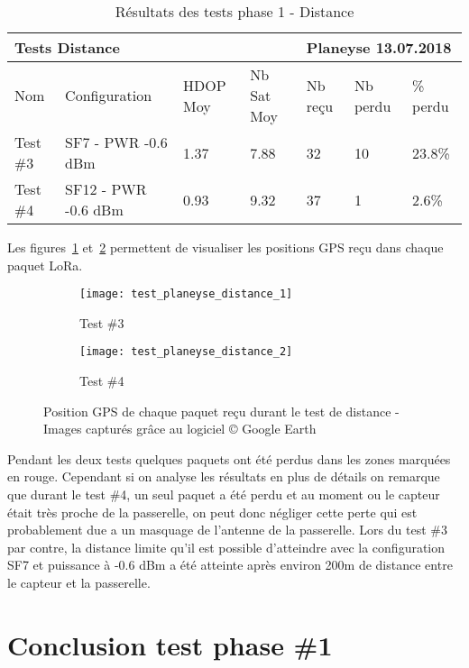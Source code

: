 \begin{table}[htb]
\caption[Résultats des tests phase 1 - Distance]{Résultats des tests phase 1 - Distance}
\label{tab:resultat_test_1_distance}
\centering
\begin{tabular}{lllllll}
\toprule
\multicolumn{4}{l}{ Tests Distance } & \multicolumn{3}{l}{ Planeyse 13.07.2018 } \\
\toprule
Nom & Configuration & HDOP Moy & Nb Sat Moy & Nb reçu & Nb perdu & \% perdu \\
\midrule
Test \#3 & SF7 - PWR -0.6 dBm & 1.37 & 7.88 & 32 & 10 & 23.8\% \\
Test \#4 & SF12 - PWR -0.6 dBm & 0.93 & 9.32 & 37 & 1 & 2.6\%  \\
\bottomrule 
\end{tabular}
\end{table}

Les figures~\ref{fig:test_distance_1} et~\ref{fig:test_distance_2} permettent de visualiser les positions GPS reçu dans chaque paquet LoRa.

\begin{figure}[htb]
\centering
\begin{subfigure}{.5\textwidth}
  \centering
  \texttt{[image: test\_planeyse\_distance\_1]}
  \caption{Test \#3}
  \label{fig:test_distance_1}
\end{subfigure}%
\begin{subfigure}{.5\textwidth}
  \centering
  \texttt{[image: test\_planeyse\_distance\_2]}
  \caption{Test \#4}
  \label{fig:test_distance_2}
\end{subfigure}
\caption[Positions GPS des tests distance]{Position GPS de chaque paquet reçu durant le test de distance - Images capturés grâce au logiciel © Google Earth}
\label{fig:test_distance}
\end{figure}

Pendant les deux tests quelques paquets ont été perdus dans les zones marquées en rouge. Cependant si on analyse les résultats en plus de détails on remarque que durant le test \#4, un seul paquet a été perdu et au moment ou le capteur était très proche de la passerelle, on peut donc négliger cette perte qui est probablement due a un masquage de l'antenne de la passerelle. 
Lors du test \#3 par contre, la distance limite qu'il est possible d'atteindre avec la configuration SF7 et puissance à -0.6 dBm a été atteinte après environ 200m de distance entre le capteur et la passerelle.

\section{Conclusion test phase \#1}

